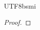 \documentclass[12pt]{article}
\theoremstyle{definition}
\newcommand\<{\langle}
\renewcommand\>{\rangle}
\begin{document}
\begin{CJK}{UTF8}{bsmi}
\begin{proof}


\end{proof}
\end{CJK}
\end{document}

